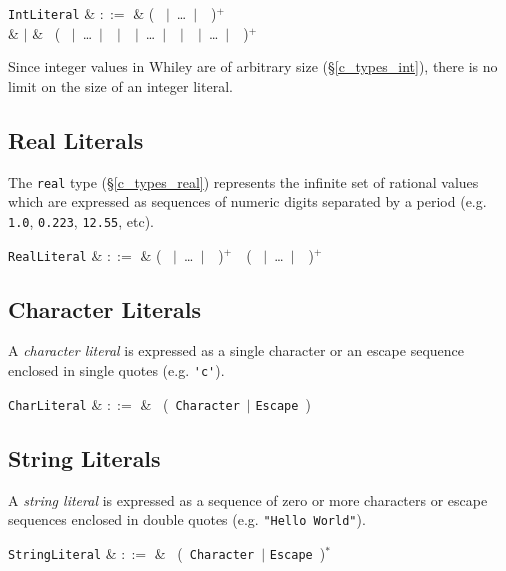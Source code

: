 \begin{syntax}
  \verb+IntLiteral+ & $::=$ & \big( \ $|$\ \ldots\ $|$\ \ \big)$^+$ \\
  & $|$ &  \ \big( \ $|$\ \ldots\ $|$\ \ $|$\ \ $|$\ \ldots\ $|$\ \ $|$\ \ $|$\ \ldots\ $|$\ \ \big)$^+$\\
\end{syntax}

Since integer values in Whiley are of arbitrary size (\S\ref{c_types_int}), there is no limit on the size of an integer literal.

\subsection{Real Literals}

The \lstinline{real} type (\S\ref{c_types_real}) represents the infinite set of rational values which are expressed as sequences of numeric digits separated by a period (e.g. \lstinline{1.0}, \lstinline{0.223}, \lstinline{12.55}, etc).

\begin{syntax}
  \verb+RealLiteral+ & $::=$ & \big( \ $|$\ \ldots\ $|$\ \ \big)$^+$\ \ \big( \ $|$\ \ldots\ $|$\ \ \big)$^+$ \\
\end{syntax}

\subsection{Character Literals}

A {\em character literal} is expressed as a single character or an escape sequence enclosed in single quotes (e.g. \lstinline{'c'}).

\begin{syntax}
  \verb+CharLiteral+ & $::=$ & \ \big(\ \verb+Character+\ $|$ \verb+Escape+\ \big)\  \\
\end{syntax}

\subsection{String Literals}

A {\em string literal} is expressed as a sequence of zero or more characters or escape sequences enclosed in double quotes (e.g. \lstinline{"Hello World"}).

\begin{syntax}
  \verb+StringLiteral+ & $::=$ & \ \big(\ \verb+Character+\ $|$ \verb+Escape+\ \big)$^*$\  \\
\end{syntax}
